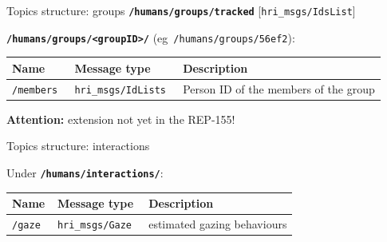 \documentclass[xcolor=table,aspectratio=169]{beamer}
\begin{document}
\begin{frame}{Topics structure: groups}
    \textbf{\texttt{/humans/groups/tracked}}
    [\texttt{hri\_msgs/IdsList}]

    \vspace{1em}

    \textbf{\texttt{/humans/groups/<groupID>/}} (eg~\texttt{/humans/groups/56ef2}):

    \scriptsize
    \begin{tabular}{@{}p{2.5cm}p{4.5cm}p{6cm}@{}}
        \toprule
        \textbf{Name} & \textbf{Message type}         & \textbf{Description}                                                \\ \midrule
        \texttt{/members                } & \texttt{hri\_msgs/IdLists         }  & Person ID of the members of the group  \\
\bottomrule
\end{tabular}

    \vspace{1em}\textbf{Attention:} extension not yet in the REP-155!
    
\end{frame}

\begin{frame}{Topics structure: interactions}

    Under \textbf{\texttt{/humans/interactions/}}:

    \scriptsize
    \begin{tabular}{@{}p{2.5cm}p{4.5cm}p{6cm}@{}}
        \toprule
        \textbf{Name} & \textbf{Message type}         & \textbf{Description}                                                \\ \midrule
        \texttt{/gaze    } & \texttt{hri\_msgs/Gaze         }  & estimated gazing behaviours    \\
\bottomrule
\end{tabular}
    
\end{frame}
\end{document}
